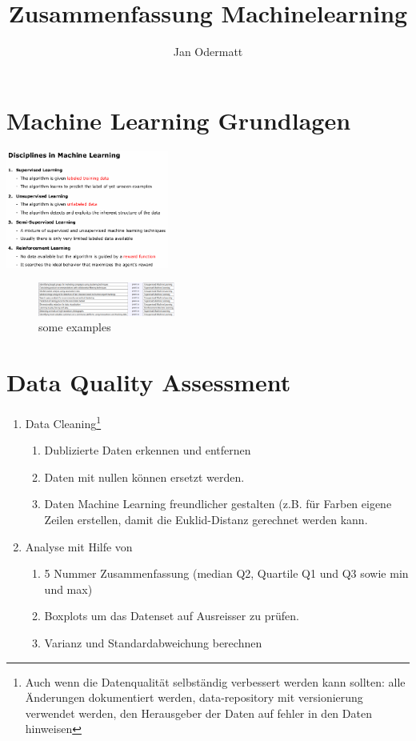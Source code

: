 \documentclass[left=1cm, right=1cm, top=1cm, bottom=1cm]{report}
\author{Jan Odermatt}
\title{Zusammenfassung Machinelearning}
\begin{document}
\tableofcontents
\section{Machine Learning Grundlagen}
\includegraphics[width=0.4\textwidth]{disciplines_in_machine_learning.png}
\begin{figure}[h]
	\includegraphics[width=0.4\textwidth]{disciplines_matched.png}
	\caption{some examples}
\end{figure}
\section{Data Quality Assessment}
	\begin{enumerate}
		\item Data Cleaning\footnote{Auch wenn die Datenqualität selbständig verbessert werden kann sollten: alle Änderungen dokumentiert werden, data-repository mit versionierung verwendet werden, den Herausgeber der Daten auf fehler in den Daten hinweisen}
		\begin{enumerate}
			\item Dublizierte Daten erkennen und entfernen
			\item Daten mit nullen können ersetzt werden.
			\item Daten Machine Learning freundlicher gestalten (z.B. für Farben eigene Zeilen erstellen, damit die Euklid-Distanz gerechnet werden kann.
		\end{enumerate}
		\item Analyse mit Hilfe von
		\begin{enumerate}
		\item 5 Nummer Zusammenfassung (median Q2, Quartile Q1 und Q3 sowie min und max)
		\item Boxplots um das Datenset auf Ausreisser zu prüfen.
		\item Varianz und Standardabweichung berechnen
		\end{enumerate}
	\end{enumerate}
\end{document}
